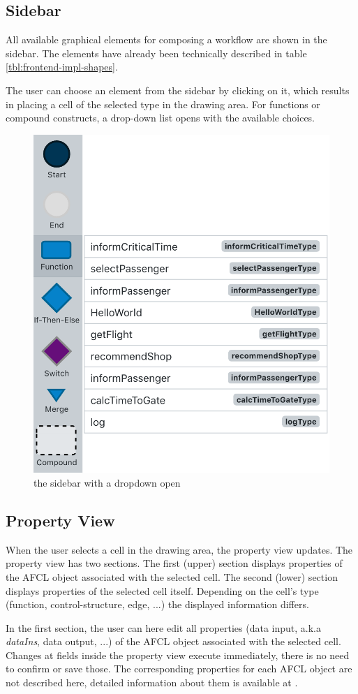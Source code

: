 \documentclass[a4paper,top=25mm,bottom=25mm,12pt,pdftex,halfparskip,twoside,bibtotoc,numbers=noenddot]{scrbook}
\begin{document}
\subsection{Sidebar}

All available graphical elements for composing a workflow are shown in the sidebar. The elements have already been technically described in table \ref{tbl:frontend-impl-shapes}.

The user can choose an element from the sidebar by clicking on it, which results in placing a cell of the selected type in the drawing area. For functions or compound constructs, a drop-down list opens with the available choices.

\begin{figure}[H]
\centering
\includegraphics[width=.4\textwidth]{sidebar}
\caption{the sidebar with a dropdown open}
\label{fig:editor-sidebar}
\end{figure}

\subsection{Property View}

When the user selects a cell in the drawing area, the property view updates. The property view has two sections. The first (upper) section displays properties of the AFCL object associated with the selected cell. The second (lower) section displays properties of the selected cell itself. Depending on the cell's type (function, control-structure, edge, ...) the displayed information differs.

In the first section, the user can here edit all properties (data input, a.k.a \textit{dataIns}, data output, ...) of the AFCL object associated with the selected cell. Changes at fields inside the property view execute immediately, there is no need to confirm or save those.
The corresponding properties for each AFCL object are not described here, detailed information about them is available at \citep{online-afcl-dps}.
\end{document}
